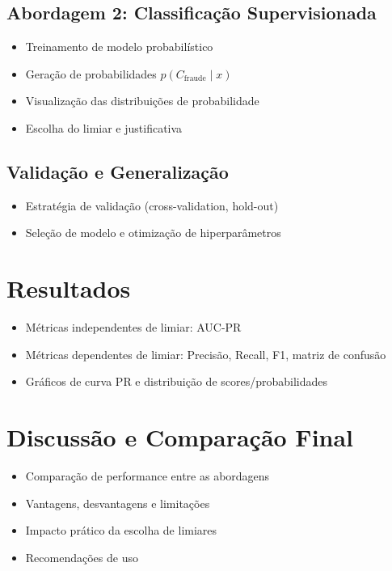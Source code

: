 \documentclass[a4paper,12pt]{article}
\begin{document}
\subsection{Abordagem 2: Classificação Supervisionada}
\label{subsec:abordagem2}
\begin{itemize}
  \item Treinamento de modelo probabilístico
  \item Geração de probabilidades $p(C_{\text{fraude}}\mid x)$
  \item Visualização das distribuições de probabilidade
  \item Escolha do limiar e justificativa
\end{itemize}

\subsection{Validação e Generalização}
\label{subsec:validacao}
\begin{itemize}
  \item Estratégia de validação (cross-validation, hold-out)
  \item Seleção de modelo e otimização de hiperparâmetros
\end{itemize}

\section{Resultados}
\label{sec:resultados}
\begin{itemize}
  \item Métricas independentes de limiar: AUC-PR
  \item Métricas dependentes de limiar: Precisão, Recall, F1, matriz de confusão
  \item Gráficos de curva PR e distribuição de scores/probabilidades
\end{itemize}

\section{Discussão e Comparação Final}
\label{sec:discussao}
\begin{itemize}
  \item Comparação de performance entre as abordagens
  \item Vantagens, desvantagens e limitações
  \item Impacto prático da escolha de limiares
  \item Recomendações de uso
\end{itemize}
\end{document}
